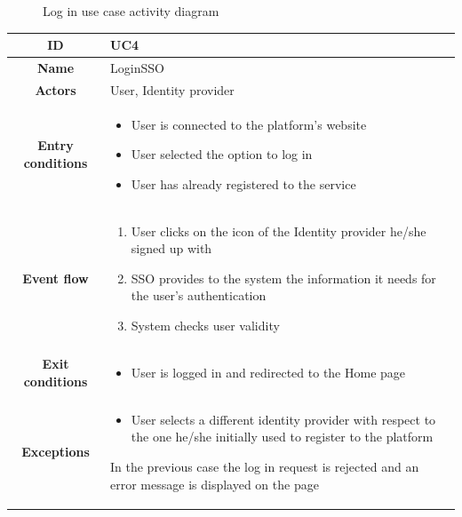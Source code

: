 \begin{center}
\begin{figure}[H]
        \caption{Log in use case activity diagram}
    \end{figure}
    \begin{tabular}{ |c|m{10cm}| }
        \hline
        \textbf{ID} & UC4 \\
        \hline
        \textbf{Name} & LoginSSO \\
        \hline
        \textbf{Actors} & User, Identity provider \\
        \hline
        \textbf{Entry conditions} &
        \begin{itemize}
            \item User is connected to the platform’s website
            \item User selected the option to log in
            \item User has already registered to the service
        \end{itemize} \\
        \hline
        \textbf{Event flow} &
        \begin{enumerate}
            \item User clicks on the icon of the Identity provider he/she signed up with
            \item SSO provides to the system the information it needs for the user’s authentication
            \item System checks user validity
        \end{enumerate} \\
        \hline
        \textbf{Exit conditions} &
        \begin{itemize}
            \item User is logged in and redirected to the Home page
        \end{itemize} \\
        \hline
        \textbf{Exceptions} & 
        \begin{itemize}
            \item User selects a different identity provider with respect to the one he/she initially used to register to the platform
        \end{itemize} 
        In the previous case the log in request is rejected and an error message is displayed on the page \\
        \hline
    \end{tabular}
    \begin{figure}[H]
        \hspace{15px}

\end{figure}
\end{center}
